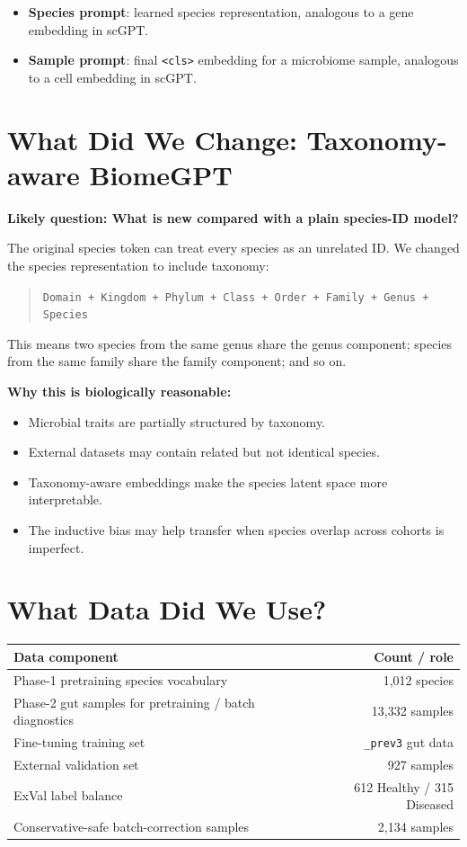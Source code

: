 \documentclass[11pt]{article}
\newcommand{\code}[1]{\texttt{\small #1}}
\begin{document}
\begin{itemize}
  \item \textbf{Species prompt}: learned species representation, analogous to a gene
  embedding in scGPT.
  \item \textbf{Sample prompt}: final \code{<cls>} embedding for a microbiome sample,
  analogous to a cell embedding in scGPT.
\end{itemize}

\section{What Did We Change: Taxonomy-aware BiomeGPT}

\textbf{Likely question: What is new compared with a plain species-ID model?}

The original species token can treat every species as an unrelated ID. We changed the
species representation to include taxonomy:

\begin{quote}
\code{Domain + Kingdom + Phylum + Class + Order + Family + Genus + Species}
\end{quote}

This means two species from the same genus share the genus component; species from the
same family share the family component; and so on.

\textbf{Why this is biologically reasonable:}

\begin{itemize}
  \item Microbial traits are partially structured by taxonomy.
  \item External datasets may contain related but not identical species.
  \item Taxonomy-aware embeddings make the species latent space more interpretable.
  \item The inductive bias may help transfer when species overlap across cohorts is
  imperfect.
\end{itemize}

\section{What Data Did We Use?}

\begin{center}
\begin{tabular}{lr}
\toprule
Data component & Count / role \\
\midrule
Phase-1 pretraining species vocabulary & 1,012 species \\
Phase-2 gut samples for pretraining / batch diagnostics & 13,332 samples \\
Fine-tuning training set & \code{\_prev3} gut data \\
External validation set & 927 samples \\
ExVal label balance & 612 Healthy / 315 Diseased \\
Conservative-safe batch-correction samples & 2,134 samples \\
\bottomrule
\end{tabular}
\end{center}
\end{document}
